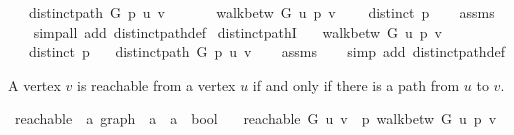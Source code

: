 \begin{isabellebody}
\ \ \ {\isachardoublequoteopen}distinct{\isacharunderscore}{\kern0pt}path\ G\ p\ u\ v{\isachardoublequoteclose}\isanewline
\ \ \isanewline
\ \ \ \ {\isachardoublequoteopen}walk{\isacharunderscore}{\kern0pt}betw\ G\ u\ p\ v{\isachardoublequoteclose}\isanewline
\ \ \ \ {\isachardoublequoteopen}distinct\ p{\isachardoublequoteclose}%
\endisataginvisible
{\isafoldinvisible}%
%
\isadeliminvisible
\isanewline
%
\endisadeliminvisible
%
\isadelimproof
\ \ %
\endisadelimproof
%
\isatagproof
{}\isamarkupfalse%
\ assms\isanewline
\ \ \isamarkupfalse%
\ {\isacharparenleft}{\kern0pt}simp{\isacharunderscore}{\kern0pt}all\ add{\isacharcolon}{\kern0pt}\ distinct{\isacharunderscore}{\kern0pt}path{\isacharunderscore}{\kern0pt}def{\isacharparenright}{\kern0pt}%
\endisatagproof
{\isafoldproof}%
%
\isadelimproof
\isanewline
%
\endisadelimproof
%
\isadeliminvisible
\isanewline
%
\endisadeliminvisible
%
\isataginvisible
{}\isamarkupfalse%
\ distinct{\isacharunderscore}{\kern0pt}pathI{\isacharcolon}{\kern0pt}\isanewline
\ \ \ {\isachardoublequoteopen}walk{\isacharunderscore}{\kern0pt}betw\ G\ u\ p\ v{\isachardoublequoteclose}\isanewline
\ \ \ {\isachardoublequoteopen}distinct\ p{\isachardoublequoteclose}\isanewline
\ \ \ {\isachardoublequoteopen}distinct{\isacharunderscore}{\kern0pt}path\ G\ p\ u\ v{\isachardoublequoteclose}%
\endisataginvisible
{\isafoldinvisible}%
%
\isadeliminvisible
\isanewline
%
\endisadeliminvisible
%
\isadelimproof
\ \ %
\endisadelimproof
%
\isatagproof
{}\isamarkupfalse%
\ assms\isanewline
\ \ \isamarkupfalse%
\ {\isacharparenleft}{\kern0pt}simp\ add{\isacharcolon}{\kern0pt}\ distinct{\isacharunderscore}{\kern0pt}path{\isacharunderscore}{\kern0pt}def{\isacharparenright}{\kern0pt}%
\endisatagproof
{\isafoldproof}%
%
\isadelimproof
%
\endisadelimproof
%
\begin{isamarkuptext}%
A vertex $v$ is reachable from a vertex $u$ if and only if there is a path from $u$ to $v$.%
\end{isamarkuptext}\isamarkuptrue%
\isamarkupfalse%
\ reachable\ {\isacharcolon}{\kern0pt}{\isacharcolon}{\kern0pt}\ {\isachardoublequoteopen}{\isacharprime}{\kern0pt}a\ graph\ {\isasymRightarrow}\ {\isacharprime}{\kern0pt}a\ {\isasymRightarrow}\ {\isacharprime}{\kern0pt}a\ {\isasymRightarrow}\ bool{\isachardoublequoteclose}\ \isanewline
\ \ {\isachardoublequoteopen}reachable\ G\ u\ v\ {\isasymequiv}\ {\isasymexists}p{\isachardot}{\kern0pt}\ walk{\isacharunderscore}{\kern0pt}betw\ G\ u\ p\ v{\isachardoublequoteclose}%

\end{isabellebody}
